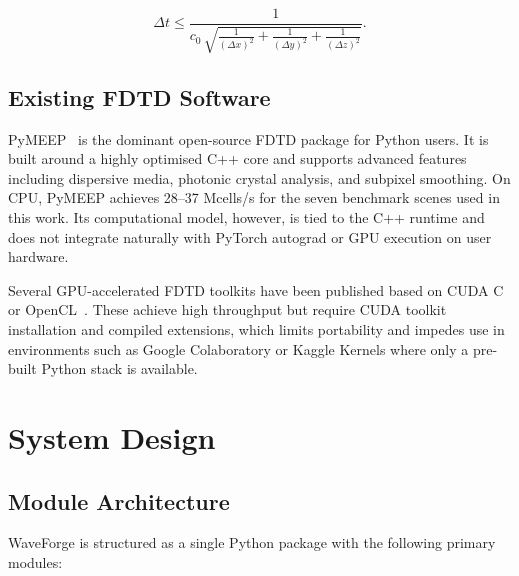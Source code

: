 \documentclass[10pt,twocolumn]{article}
\begin{document}
\begin{equation}
  \Delta t \leq \frac{1}{c_0\,\sqrt{\frac{1}{(\Delta x)^2}
    + \frac{1}{(\Delta y)^2} + \frac{1}{(\Delta z)^2}}}.
  \label{eq:cfl}
\end{equation}

\subsection{Existing FDTD Software}

PyMEEP~\cite{oskooi2010meep} is the dominant open-source FDTD package for
Python users. It is built around a highly optimised C++ core and supports
advanced features including dispersive media, photonic crystal analysis, and
subpixel smoothing. On CPU, PyMEEP achieves 28--37 Mcells/s for the seven
benchmark scenes used in this work. Its computational model, however, is tied
to the C++ runtime and does not integrate naturally with PyTorch autograd
or GPU execution on user hardware.

Several GPU-accelerated FDTD toolkits have been published based on CUDA
C~\cite{chen2020gpu} or OpenCL~\cite{winter2015fdtd}. These achieve high
throughput but require CUDA toolkit installation and compiled extensions,
which limits portability and impedes use in environments such as Google
Colaboratory or Kaggle Kernels where only a pre-built Python stack is
available.

\section{System Design}
\label{sec:design}

\subsection{Module Architecture}

WaveForge is structured as a single Python package with the following
primary modules:
\end{document}
